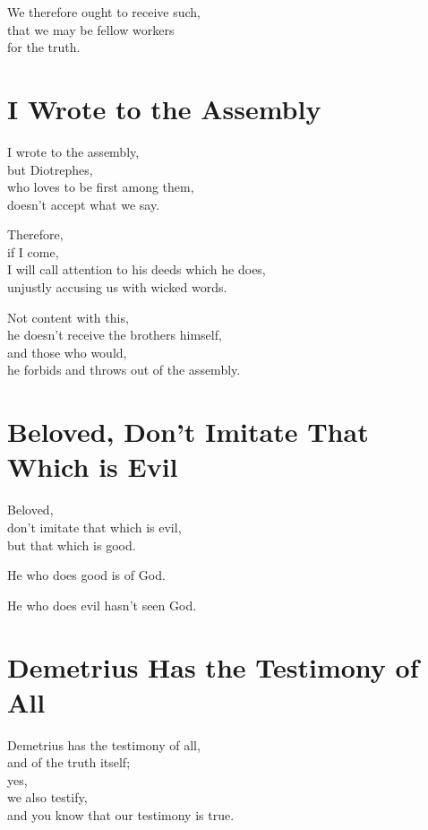 \documentclass[twoside, openany, 12pt]{extbook}
\newcommand{\tab}[1][0.5cm]{\hspace*{#1}}
\begin{document}
We therefore ought to receive such,
\\
that we may be fellow workers
\\
\tab{}
for the truth.

\newpage\section{I Wrote to the Assembly}

I wrote to the assembly,
\\
but Diotrephes,
\\
\tab{}
who loves to be first among them,
\\
doesn’t accept what we say.

Therefore,
\\
if I come,
\\
I will call attention to his deeds which he does,
\\
\tab{}
unjustly accusing us with wicked words.

Not content with this,
\\
\tab{}
he doesn’t receive the brothers himself,
\\
\tab{}
and those who would,
\\
\tab{}
\tab{}
he forbids and throws out of the assembly.

\newpage\section{Beloved, Don’t Imitate That Which is Evil}

Beloved,
\\
don’t imitate that which is evil,
\\
but that which is good.

He who does good is of God.

He who does evil hasn’t seen God.

\newpage\section{Demetrius Has the Testimony of All}

Demetrius has the testimony of all,
\\
and of the truth itself;
\\
yes,
\\
we also testify,
\\
and you know that our testimony is true.
\end{document}
